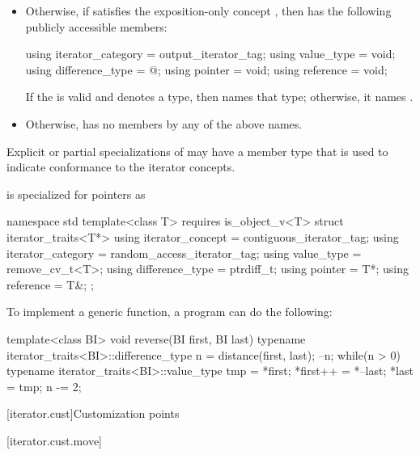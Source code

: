 \begin{itemize}
\item
Otherwise, if  satisfies the exposition-only concept
, then 
has the following publicly accessible
members:
\begin{codeblock}
using iterator_category = output_iterator_tag;
using value_type        = void;
using difference_type   = @\seebelow@;
using pointer           = void;
using reference         = void;
\end{codeblock}
If the 
 is valid and denotes a type,
then  names that type; otherwise, it names .

\item
Otherwise, 
has no members by any of the above names.
\end{itemize}

\pnum
Explicit or partial specializations of  may
have a member type  that is used to indicate
conformance to the iterator concepts.

\pnum
{} is specialized for pointers as
\begin{codeblock}
namespace std {
  template<class T>
    requires is_object_v<T>
  struct iterator_traits<T*> {
    using iterator_concept  = contiguous_iterator_tag;
    using iterator_category = random_access_iterator_tag;
    using value_type        = remove_cv_t<T>;
    using difference_type   = ptrdiff_t;
    using pointer           = T*;
    using reference         = T&;
  };
}
\end{codeblock}

\pnum
\begin{example}
To implement a generic
function, a \Cpp{} program can do the following:
\begin{codeblock}
template<class BI>
void reverse(BI first, BI last) {
  typename iterator_traits<BI>::difference_type n =
    distance(first, last);
  --n;
  while(n > 0) {
    typename iterator_traits<BI>::value_type
     tmp = *first;
    *first++ = *--last;
    *last = tmp;
    n -= 2;
  }
}
\end{codeblock}
\end{example}

[iterator.cust]{Customization points}

[iterator.cust.move]{}

